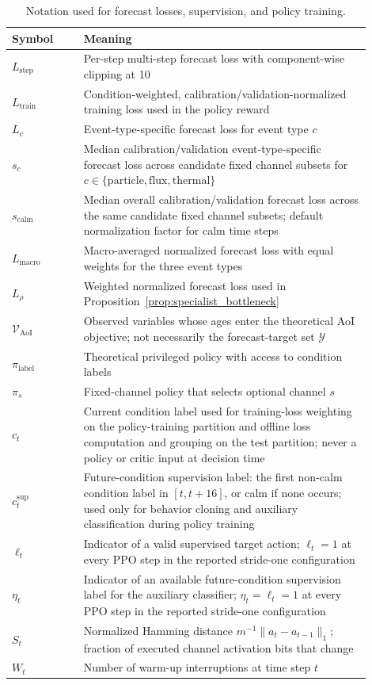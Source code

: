 \begin{table}[htbp]
  \centering
  \caption{Notation used for forecast losses, supervision, and policy training.}
  \label{tab:notation_objectives}
  \scriptsize
  \setlength{\tabcolsep}{4pt}
  \begin{tabular}{@{}p{0.18\linewidth}p{0.72\linewidth}@{}}
    \toprule
    Symbol & Meaning \\
    \midrule
    $L_{\mathrm{step}}$ & Per-step multi-step forecast loss with component-wise clipping at 10 \\
    $L_{\mathrm{train}}$ & Condition-weighted, calibration/validation-normalized training loss used in the policy reward \\
    $L_c$ & Event-type-specific forecast loss for event type $c$ \\
    $s_c$ & Median calibration/validation event-type-specific forecast loss across candidate fixed channel subsets for $c\in\{\mathrm{particle},\mathrm{flux},\mathrm{thermal}\}$ \\
    $s_{\mathrm{calm}}$ & Median overall calibration/validation forecast loss across the same candidate fixed channel subsets; default normalization factor for calm time steps \\
    $L_{\mathrm{macro}}$ & Macro-averaged normalized forecast loss with equal weights for the three event types \\
    $L_{\rho}$ & Weighted normalized forecast loss used in Proposition~\ref{prop:specialist_bottleneck} \\
    $\mathcal{V}_{\mathrm{AoI}}$ & Observed variables whose ages enter the theoretical AoI objective; not necessarily the forecast-target set $\mathcal{Y}$ \\
    $\pi_{\text{label}}$ & Theoretical privileged policy with access to condition labels \\
    $\pi_s$ & Fixed-channel policy that selects optional channel $s$ \\
    $c_t$ & Current condition label used for training-loss weighting on the policy-training partition and offline loss computation and grouping on the test partition; never a policy or critic input at decision time \\
    $c_t^{\mathrm{sup}}$ & Future-condition supervision label: the first non-calm condition label in $[t,t+16]$, or calm if none occurs; used only for behavior cloning and auxiliary classification during policy training \\
    $\ell_t$ & Indicator of a valid supervised target action; $\ell_t=1$ at every PPO step in the reported stride-one configuration \\
    $\eta_t$ & Indicator of an available future-condition supervision label for the auxiliary classifier; $\eta_t=\ell_t=1$ at every PPO step in the reported stride-one configuration \\
    $S_t$ & Normalized Hamming distance $m^{-1}\lVert a_t-a_{t-1}\rVert_1$; fraction of executed channel activation bits that change \\
    $W_t$ & Number of warm-up interruptions at time step $t$ \\
    \bottomrule
  \end{tabular}
\end{table}
